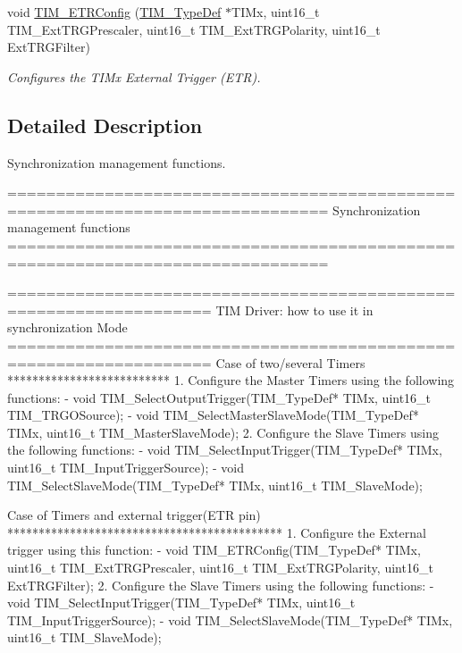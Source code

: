 \begin{DoxyCompactItemize}
void \hyperlink{group___t_i_m___group7_ga8bdde400b7a30f3e747fe8e4962c0abe}{T\+I\+M\+\_\+\+E\+T\+R\+Config} (\hyperlink{struct_t_i_m___type_def}{T\+I\+M\+\_\+\+Type\+Def} $\ast$T\+I\+Mx, uint16\+\_\+t T\+I\+M\+\_\+\+Ext\+T\+R\+G\+Prescaler, uint16\+\_\+t T\+I\+M\+\_\+\+Ext\+T\+R\+G\+Polarity, uint16\+\_\+t Ext\+T\+R\+G\+Filter)
\begin{DoxyCompactList}\small\item\em Configures the T\+I\+Mx External Trigger (E\+TR). \end{DoxyCompactList}\end{DoxyCompactItemize}


\subsection{Detailed Description}
Synchronization management functions. 

\begin{DoxyVerb} ===============================================================================
                       Synchronization management functions
 ===============================================================================  
                   
       ===================================================================      
              TIM Driver: how to use it in synchronization Mode
       =================================================================== 
       Case of two/several Timers
       **************************
       1. Configure the Master Timers using the following functions:
          - void TIM_SelectOutputTrigger(TIM_TypeDef* TIMx, uint16_t TIM_TRGOSource); 
          - void TIM_SelectMasterSlaveMode(TIM_TypeDef* TIMx, uint16_t TIM_MasterSlaveMode);  
       2. Configure the Slave Timers using the following functions: 
          - void TIM_SelectInputTrigger(TIM_TypeDef* TIMx, uint16_t TIM_InputTriggerSource);  
          - void TIM_SelectSlaveMode(TIM_TypeDef* TIMx, uint16_t TIM_SlaveMode); 
          
       Case of Timers and external trigger(ETR pin)
       ********************************************       
       1. Configure the External trigger using this function:
          - void TIM_ETRConfig(TIM_TypeDef* TIMx, uint16_t TIM_ExtTRGPrescaler, uint16_t TIM_ExtTRGPolarity,
                               uint16_t ExtTRGFilter);
       2. Configure the Slave Timers using the following functions: 
          - void TIM_SelectInputTrigger(TIM_TypeDef* TIMx, uint16_t TIM_InputTriggerSource);  
          - void TIM_SelectSlaveMode(TIM_TypeDef* TIMx, uint16_t TIM_SlaveMode); \end{DoxyVerb}
 


